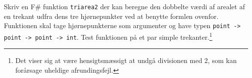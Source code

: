 Skriv en F\# funktion \lstinline{triarea2} der kan beregne den
  dobbelte værdi af arealet af en trekant udfra dens tre hjørnepunkter
  ved at benytte formlen ovenfor. Funktionen skal tage hjørnepunkterne
  som argumenter og have typen \lstinline{point -> point -> point -> int}. Test funktionen på et par simple trekanter.\footnote{Det
    viser sig at være hensigtsmæssigt at undgå divisionen med 2, som
    kan forårsage uheldige afrundingsfejl.}

